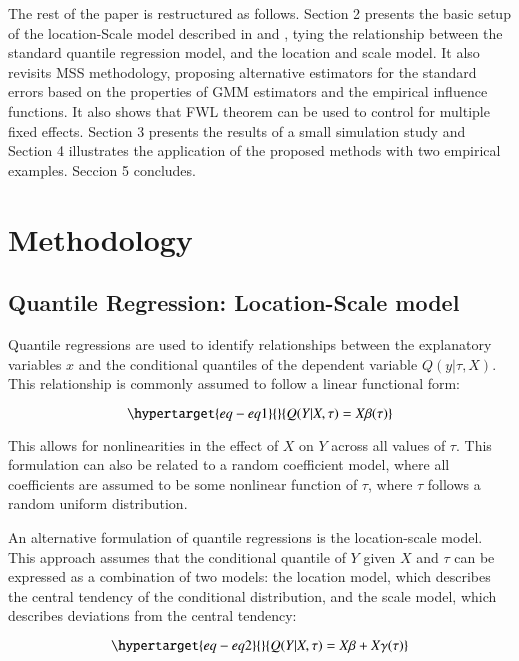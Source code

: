 \documentclass[
  authoryear,
  preprint,
  1p]{elsarticle}
\begin{document}
The rest of the paper is restructured as follows. Section 2 presents the
basic setup of the location-Scale model described in \citet{he1997} and
\citet{zhao2000}, tying the relationship between the standard quantile
regression model, and the location and scale model. It also revisits MSS
methodology, proposing alternative estimators for the standard errors
based on the properties of GMM estimators and the empirical influence
functions. It also shows that FWL theorem can be used to control for
multiple fixed effects. Section 3 presents the results of a small
simulation study and Section 4 illustrates the application of the
proposed methods with two empirical examples. Seccion 5 concludes.

\hypertarget{methodology}{%
\section{Methodology}\label{methodology}}

\hypertarget{sec-betas}{%
\subsection{Quantile Regression: Location-Scale model}\label{sec-betas}}

Quantile regressions are used to identify relationships between the
explanatory variables \(x\) and the conditional quantiles of the
dependent variable \(Q(y|\tau,X)\). This relationship is commonly
assumed to follow a linear functional form:

\begin{equation}\protect\hypertarget{eq-eq1}{}{Q(Y|X,\tau) =X\beta(\tau)
}\label{eq-eq1}\end{equation}

This allows for nonlinearities in the effect of \(X\) on \(Y\) across
all values of \(\tau\). This formulation can also be related to a random
coefficient model, where all coefficients are assumed to be some
nonlinear function of \(\tau\), where \(\tau\) follows a random uniform
distribution.

An alternative formulation of quantile regressions is the location-scale
model. This approach assumes that the conditional quantile of \(Y\)
given \(X\) and \(\tau\) can be expressed as a combination of two
models: the location model, which describes the central tendency of the
conditional distribution, and the scale model, which describes
deviations from the central tendency:

\begin{equation}\protect\hypertarget{eq-eq2}{}{Q(Y|X,\tau) =X\beta+X\gamma(\tau)
}\label{eq-eq2}\end{equation}
\end{document}
